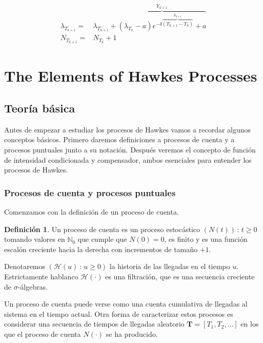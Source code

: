 \documentclass[a4paper,11pt]{book}
\begin{document}
\begin{align*}
    \lambda_{T_{k+1}}=&\lambda_{T^-_{k+1}}+ \overbrace{(\lambda_{T_k}-a)e^{-\delta \overbrace{(T_{k+1}-T_k)}^{S_{k+1}}}+a}^{Y_{k+1}}\\
    N_{T_{k+1}}=&N_{T_k}+1
\end{align*}

\chapter{The Elements of Hawkes Processes}

\section{Teoría básica}
Antes de empezar a estudiar los procesos de Hawkes vamos a recordar algunos conceptos básicos. Primero daremos definiciones a procesos de cuenta y a procesos 
puntuales junto a su notación. Después veremos el concepto de función de intensidad condicionada y compensador, ambos esenciales para entender los procesos de Hawkes. 
\subsection{Procesos de cuenta y procesos puntuales}
Comenzamos con la definición de un proceso de cuenta.

\textbf{Definición 1}. Un proceso de cuenta es un proceso estocástico $(N(t))\,:\,t\geq 0$ tomando valores en $\mathbb{N}_0$ que cumple que $N(0)=0$, es finito y es una función escalón
creciente hacia la derecha con incrementos de tamaño $+1$. 

Denotaremos $(\mathcal{H}(u)\,:\,u\geq 0)$ la historia de las llegadas en el tiempo $u$. Estrictamente hablanco $\mathcal{H}(\cdot)$ es una filtración, que es una secuencia creciente de 
$\sigma$-álgebras.

Un proceso de cuenta puede verse como una cuenta cumulativa de llegadas al sistema en el tiempo actual. Otra forma de caracterizar estos procesos es considerar una secuencia de tiempos 
de llegadas aleatorio $\mathbf{T}=[T_1,T_2,\ldots]$ en los que el proceso de cuenta $N(\cdot)$ se ha producido.  
\end{document}
